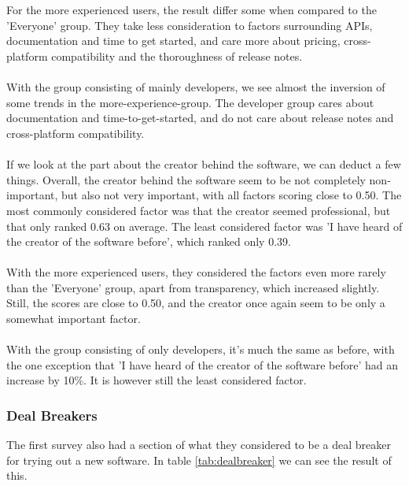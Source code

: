 \documentclass{article}
\begin{document}
\\ \\
For the more experienced users, the result differ some when compared to the 'Everyone' group. They take less consideration to factors surrounding APIs,
documentation and time to get started, and care more about pricing,
cross-platform compatibility and the thoroughness of release notes.
\\ \\
With the group consisting of mainly developers, we see almost the
inversion of some trends in the more-experience-group. The developer
group cares about documentation and time-to-get-started, and do not care
about release notes and cross-platform compatibility.
\\ \\
If we look at the part about the creator behind the software, we can deduct a few things.
Overall, the creator behind the software seem to be not completely non-important,
but also not very important, with all factors scoring close to 0.50. The most
commonly considered factor was that the creator seemed professional, but
that only ranked 0.63 on average. The least considered factor was 'I have heard of
the creator of the software before', which ranked only 0.39.
\\ \\
With the more experienced users, they considered the factors even more
rarely than the 'Everyone' group, apart from transparency, which increased
slightly. Still, the scores are close to 0.50, and the creator once again
seem to be only a somewhat important factor.
\\ \\
With the group consisting of only developers, it's much the same as
before, with the one exception that 'I have heard of the creator of the
software before' had an increase by 10\%. It is however still the least
considered factor.
\subsubsection{Deal Breakers}
The first survey also had a section of what they considered to be a deal breaker for trying out a new software.
In table \ref{tab:dealbreaker} we can see the result of this.
\end{document}
